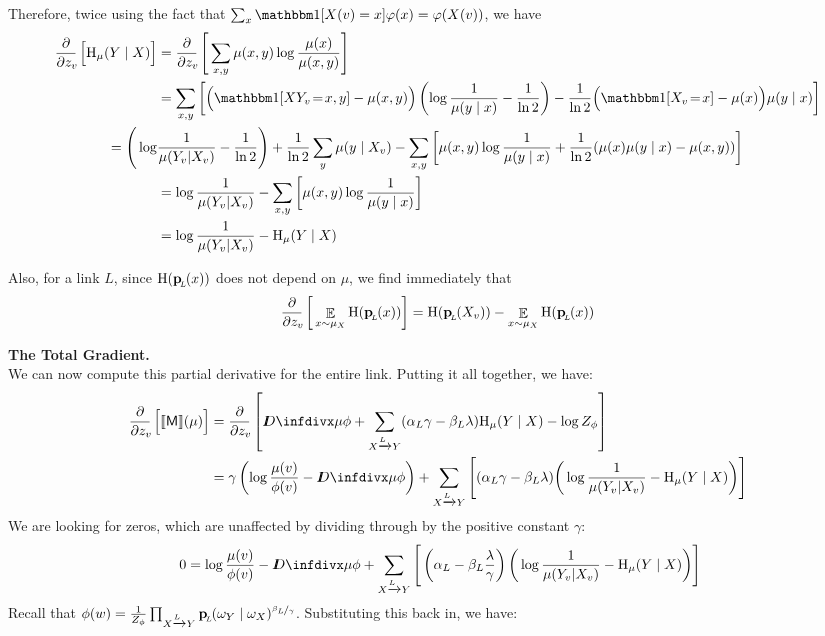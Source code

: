 \documentclass{article}
\newcommand{\bp}[1][L]{\mat{p}_{\!_#1\!}}
\newcommand{\sfM}{\mathsf M}
\newcommand{\alle}[1][L]{_{ X \xrightarrow{\!\!#1} Y }}
\begin{document}
	Therefore, twice using the fact that $\sum_x \mathbbm1[X(v) = x]\varphi(x) = \varphi(X(v))$, we have
	\begin{align*}
		\pz{\H_\mu(Y \mid X)} &= \pz{\sum_{x,y}\mu(x,y) \log \frac{\mu(x)}{\mu(x,y)}} \\
			&= \sum_{x,y} \left[ \Big(\mathbbm1[XY_v \!=\! x,y] - \mu(x,y)\Big)\left(\log \frac{1}{\mu(y \mid x)} - \frac{1}{\ln 2}\right) -  \frac{1}{\ln 2} \Big(\mathbbm1[X_v \!=\! x] - \mu(x)\Big) \mu(y \mid x) \right] \\
			= \Bigg(\log& \frac{1}{\mu(Y_v | X_v)} - \frac{1}{\ln 2}\Bigg)  + \frac{1}{\ln 2} \sum_{y} \mu(y \mid X_v) - \sum_{x,y} \left[\mu(x,y) \log\frac{1}{\mu(y\mid x)} + \frac{1}{\ln2} (\mu(x)\mu(y\mid x) - \mu(x,y)) \right] \\
			&= \log \frac{1}{\mu(Y_v | X_v)} - \sum_{x,y} \left[\mu(x,y) \log\frac{1}{\mu(y\mid x)} \right] \\
			&= \log \frac{1}{\mu(Y_v | X_v)} - \H_\mu(Y \mid X)
	\end{align*}
	
	Also, for a link $L$, since $\H(\bp(x))$ does not depend on $\mu$, we find immediately that 
	\[\pz{ \E_{x \sim \mu_X} \H(\bp(x)) }  = \H(\bp(X_v)) - \E_{x \sim \mu_X} \H(\bp(x))  \] 
	\endgroup
	
	\textbf{The Total Gradient.}\\
	We can now compute this partial derivative for the entire link. Putting it all together, we have:
	\begin{equation}
	\begin{aligned}
		\pz{\bbr{\sfM}(\mu)} &= 
		\pz{\kldiv{\mu}{\phi} + \sum\alle (\alpha_L \gamma - \beta_L \lambda ) \H_\mu(Y \mid X) - \log Z_\phi }\\
			&= 
			\gamma \left(\log\frac{\mu(v)}{\phi(v)} - \kldiv{\mu}{\phi} \right) + \sum\alle\Bigg[ (\alpha_L \gamma - \beta_L \lambda ) \bigg(\log \frac{1}{\mu(Y_v | X_v)} - \H_\mu(Y \mid X) \bigg) \Bigg] 
	\end{aligned}\label{eq:totgrad}
	\end{equation}
	We are looking for zeros, which are unaffected by dividing through by the positive constant $\gamma$:
	\[\ 0 = \log\frac{\mu(v)}{\phi(v)} - \kldiv{\mu}{\phi} + \sum\alle\Bigg[ \left(\alpha_L  - \beta_L \frac{\lambda}{\gamma} \right) \bigg(\log \frac{1}{\mu(Y_v | X_v)} - \H_\mu(Y \mid X) \bigg) \Bigg]  \]
	Recall that $\phi(w) = \frac{1}{Z_{\phi}}\prod\alle \bp(\omega_Y \mid \omega_X)^{\nicefrac{\beta_L}{\gamma}}$. Substituting this back in, we have:
	
\end{document}
